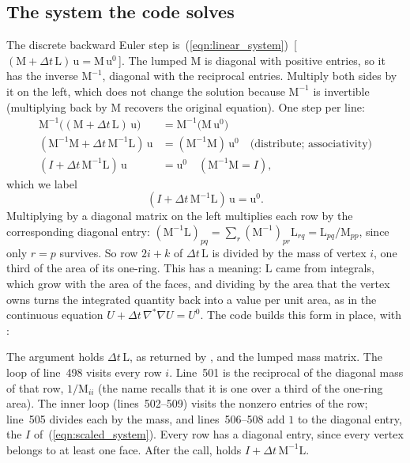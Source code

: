 \subsection{The system the code solves}

The discrete backward Euler step is~(\ref{eqn:linear_system})~[\,$(\mathrm M + \Delta t\,\mathrm L)\,\mathrm u = \mathrm M\,\mathrm u^0$\,]. The lumped $\mathrm M$ is diagonal with positive entries, so it has the inverse $\mathrm M^{-1}$, diagonal with the reciprocal entries. Multiply both sides by it on the left, which does not change the solution because $\mathrm M^{-1}$ is invertible (multiplying back by $\mathrm M$ recovers the original equation). One step per line:
\begin{align*}
\mathrm M^{-1}\big((\mathrm M + \Delta t\,\mathrm L)\,\mathrm u\big) &= \mathrm M^{-1}\big(\mathrm M\,\mathrm u^0\big) \\
(\mathrm M^{-1}\mathrm M + \Delta t\,\mathrm M^{-1}\mathrm L)\,\mathrm u &= (\mathrm M^{-1}\mathrm M)\,\mathrm u^0 \quad \text{(distribute; associativity)}\\
(I + \Delta t\,\mathrm M^{-1}\mathrm L)\,\mathrm u &= \mathrm u^0 \quad (\mathrm M^{-1}\mathrm M = I) ,
\end{align*}
which we label
\begin{equation}
\label{eqn:scaled_system}
(I + \Delta t\, \mathrm M^{-1} \mathrm L)\, \mathrm u = \mathrm u^0 .
\end{equation}
Multiplying by a diagonal matrix on the left multiplies each row by the corresponding diagonal entry: $(\mathrm M^{-1}\mathrm L)_{pq} = \sum_r (\mathrm M^{-1})_{pr}\mathrm L_{rq} = \mathrm L_{pq}/\mathrm M_{pp}$, since only $r = p$ survives. So row $2i + k$ of $\Delta t\,\mathrm L$ is divided by the mass of vertex $i$, one third of the area of its one-ring. This has a meaning: $\mathrm L$ came from integrals, which grow with the area of the faces, and dividing by the area that the vertex owns turns the integrated quantity back into a value per unit area, as in the continuous equation $U + \Delta t\,\nabla^*\nabla U = U^0$. The code builds this form in place, with :

The argument  holds $\Delta t\,\mathrm L$, as returned by , and  the lumped mass matrix. The loop of line~498 visits every row $i$. Line~501 is the reciprocal of the diagonal mass of that row, $1/\mathrm M_{ii}$ (the name recalls that it is one over a third of the one-ring area). The inner loop (lines~502--509) visits the nonzero entries of the row; line~505 divides each by the mass, and lines~506--508 add $1$ to the diagonal entry, the $I$ of~(\ref{eqn:scaled_system}). Every row has a diagonal entry, since every vertex belongs to at least one face. After the call,  holds $I + \Delta t\,\mathrm M^{-1}\mathrm L$.

